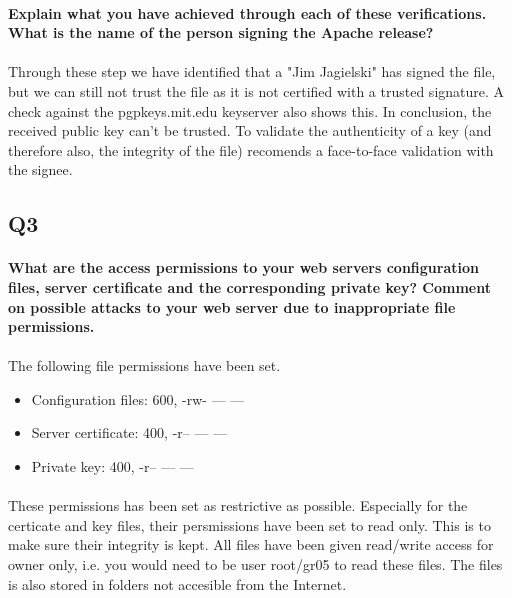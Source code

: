 \documentclass[a4paper,11pt]{article}
\begin{document}
\paragraph{Explain what you have achieved through each of these veriﬁcations. What is the name of the person signing the Apache release?}
\paragraph{}Through these step we have identified that a "Jim Jagielski" has signed the file, but we can still not trust the file as it is not certified with a trusted signature. A check against the pgpkeys.mit.edu keyserver also shows this. In conclusion, the received public key can't be trusted. To validate the authenticity of a key (and therefore also, the integrity of the file) \cite{4} recomends a face-to-face validation with the signee. 
\subsection{Q3}
\paragraph{What are the access permissions to your web servers conﬁguration files, server certiﬁcate and the corresponding private key? Comment on possible attacks to your web server due to inappropriate file permissions.}
\paragraph{}The following file permissions have been set.
\begin{itemize}
	\item Configuration files: 600, -rw- --- ---
	\item Server certificate: 400, -r-- --- ---
	\item Private key: 400, -r-- --- ---
\end{itemize}
\paragraph{} These permissions has been set as restrictive as possible. Especially for the certicate and key files, their persmissions have been set to read only. This is to make sure their integrity is kept. All files have been given read/write access for owner only, i.e. you would need to be user root/gr05 to read these files. The files is also stored in folders not accesible from the Internet.
\end{document}
